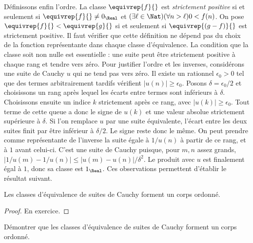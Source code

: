 \documentclass[../../../include/open-logic-section]{subfiles}
\begin{document}
Définissons enfin l'ordre. La classe $\equivrep{f}{}$ est
\emph{strictement positive} si et seulement si
$\equivrep{f}{}\neq0_\Real$ et
$(\exists\ell\in\Nat)(\forall n>\ell)0<f(n)$.
On pose $\equivrep{f}{}<\equivrep{g}{}$ si et seulement si
$\equivrep{(g-f)}{}$ est strictement positive. Il faut vérifier que
cette définition ne dépend pas du choix de la fonction représentante
dans chaque classe d'équivalence.
La condition que la classe soit non nulle est essentielle : une suite
peut être strictement positive à chaque rang et tendre vers zéro.
Pour justifier l'ordre et les inverses, considérons une suite de Cauchy
$u$ qui ne tend pas vers zéro. Il existe un rationnel $\epsilon_0>0$
tel que des termes arbitrairement tardifs vérifient
$|u(n)|\geq\epsilon_0$. Posons $\delta=\epsilon_0/2$ et choisissons
un rang après lequel les écarts entre termes sont inférieurs à $\delta$.
Choisissons ensuite un indice $k$ strictement après ce rang, avec
$|u(k)|\geq\epsilon_0$. Tout terme de cette queue a donc le signe
de $u(k)$ et une valeur absolue strictement supérieure à $\delta$.
Si l’on remplace $u$ par une suite équivalente, l’écart entre les
deux suites finit par être inférieur à $\delta/2$. Le signe reste
donc le même. On peut prendre comme représentante de l'inverse la
suite égale à $1/u(n)$ à partir de ce rang, et à $1$ avant celui-ci.
C'est une suite de Cauchy puisque, pour $m,n$ assez grands,
$|1/u(m)-1/u(n)|\leq |u(m)-u(n)|/\delta^2$.
Le produit avec $u$ est finalement égal à $1$, donc sa classe est $1_\Real$.
Ces observations permettent d'établir le résultat suivant.
%
%
%
%
\begin{thm}
Les classes d'équivalence de suites de Cauchy forment un corps ordonné.
\end{thm}

\begin{proof}
En exercice.
\end{proof}

\begin{prob}
Démontrer que les classes d'équivalence de suites de Cauchy forment
un corps ordonné.
\end{prob}
\end{document}

